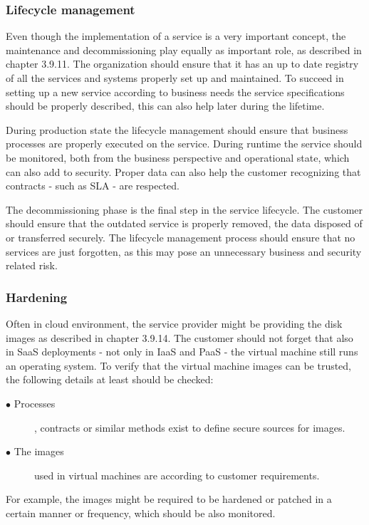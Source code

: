 \documentclass{article}
\begin{document}
\subsubsection{Lifecycle management}
Even though the implementation of a service is a very important concept, the maintenance and decommissioning play equally as important role, as described in chapter 3.9.11. The organization should ensure that it has an up to date registry of all the services and systems properly set up and maintained. To succeed in setting up a new service according to business needs the service specifications should be properly described, this can also help later during the lifetime.
\par
During production state the lifecycle management should ensure that business processes are properly executed on the service. During runtime the service should be monitored, both from the business perspective and operational state, which can also add to security. Proper data can also help the customer recognizing that contracts - such as SLA - are respected.
\par
The decommissioning phase is the final step in the service lifecycle. The customer should ensure that the outdated service is properly removed, the data disposed of or transferred securely. The lifecycle management process should ensure that no services are just forgotten, as this may pose an unnecessary business and security related risk.

\subsubsection{Hardening}
Often in cloud environment, the service provider might be providing the disk images as described in chapter 3.9.14. The customer should not forget that also in SaaS deployments - not only in IaaS and PaaS - the virtual machine still runs an operating system. To verify that the virtual machine images can be trusted, the following details at least should be checked:
\begin{description}
	\item[$\bullet$ Processes], contracts or similar methods exist to define secure sources for images.
	\item[$\bullet$ The images] used in virtual machines are according to customer requirements.
\end{description}
For example, the images might be required to be hardened or patched in a certain manner or frequency, which should be also monitored.
\end{document}
